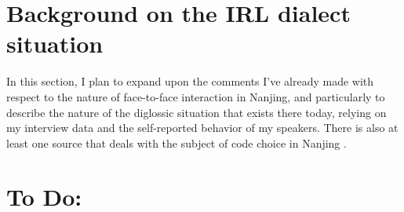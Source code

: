\section{Background on the IRL dialect situation}
In this section, I plan to expand upon the comments I’ve already made with respect to the nature of face-to-face interaction in Nanjing, and particularly to describe the nature of the diglossic situation that exists there today, relying on my interview data and the self-reported behavior of my speakers. There is also at least one source that deals with the subject of code choice in Nanjing \citep{xu2006nanjing}.

\pagebreak

\section{To Do:}
